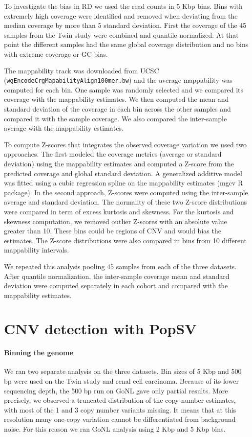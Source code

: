 To investigate the bias in RD we used the read counts in 5 Kbp bins.
Bins with extremely high coverage were identified and removed when deviating from the median coverage by more than 5 standard deviation.
First the coverage of the 45 samples from the Twin study were combined and quantile normalized.
At that point the different samples had the same global coverage distribution and no bins with extreme coverage or GC bias.

The mappability track\cite{Derrien2012} was downloaded from UCSC\cite{Rosenbloom2015} \\(\verb!wgEncodeCrgMapabilityAlign100mer.bw!) and the average mappability was computed for each bin.
One sample was randomly selected and we compared its coverage with the mappability estimates.
We then computed the mean and standard deviation of the coverage in each bin across the other samples and compared it with the sample coverage.
We also compared the inter-sample average with the mappability estimates.

To compute Z-scores that integrates the observed coverage variation we used two approaches.
The first modeled the coverage metrics (average or standard deviation) using the mappability estimates and computed a Z-score from the predicted coverage and global standard deviation.
A generalized additive model was fitted using a cubic regression spline on the mappability estimates ({\sf mgcv} R package).
In the second approach, Z-scores were computed using the inter-sample average and standard deviation.
The normality of these two Z-score distributions were compared in term of excess kurtosis and skewness.
For the kurtosis and skewness computation, we removed outlier Z-scores with an absolute value greater than 10. These bins could be regions of CNV and would bias the estimates.
The Z-score distributions were also compared in bins from 10 different mappability intervals.

We repeated this analysis pooling 45 samples from each of the three datasets.
After quantile normalization, the inter-sample coverage mean and standard deviation were computed separately in each cohort and compared with the mappability estimates.

\section*{CNV detection with {\sf PopSV}}

\paragraph{Binning the genome}
We ran two separate analysis on the three datasets.
Bin sizes of 5 Kbp and 500 bp were used on the Twin study and renal cell carcinoma.
Because of its lower sequencing depth, the 500 bp run on GoNL gave only partial results.
More precisely, we observed a truncated distribution of the copy-number estimates, with most of the 1 and 3 copy number variants missing.
It means that at this resolution many one-copy variation cannot be differentiated from background noise.
For this reason we ran GoNL analysis using 2 Kbp and 5 Kbp bins.


